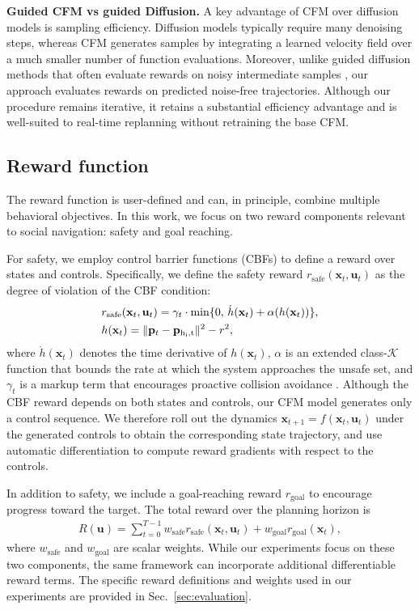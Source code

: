 \documentclass[letterpaper,10 pt,conference]{ieeeconf}
\begin{document}
\noindent\textbf{Guided CFM vs guided Diffusion.} 
A key advantage of CFM over diffusion models is sampling efficiency. 
Diffusion models typically require many denoising steps, whereas CFM generates samples by integrating a learned velocity field over a much smaller number of function evaluations. 
Moreover, unlike guided diffusion methods that often evaluate rewards on noisy intermediate samples \cite{MizutaLeung2024}, our approach evaluates rewards on predicted noise-free trajectories. 
Although our procedure remains iterative, it retains a substantial efficiency advantage and is well-suited to real-time replanning without retraining the base CFM.

\subsection{Reward function} 
The reward function is user-defined and can, in principle, combine multiple behavioral objectives. 
In this work, we focus on two reward components relevant to social navigation: safety and goal reaching. 

For safety, we employ control barrier functions (CBFs) \cite{AmesCooganEtAl2019} to define a reward over states and controls. 
Specifically, we define the safety reward $r_\mathrm{safe}(\mathbf{x}_t,\mathbf{u}_t)$ as the degree of violation of the CBF condition:
\begin{align}
    &r_\mathrm{safe}(\mathbf{x}_t, \mathbf{u}_t) = \gamma_t\cdot\min\{0,\,\dot{h}(\mathbf{x}_t) + \alpha(h(\mathbf{x}_t))\},\\
    &h(\mathbf{x}_t) = \|\mathbf{p}_t - \mathbf{p}_\mathrm{h_i,t}\|^2 - r^2,\notag
\end{align}
where $\dot{h}(\mathbf{x}_t)$ denotes the time derivative of $h(\mathbf{x}_t)$, $\alpha$ is an extended class-$\mathcal{K}$ function that bounds the rate at which the system approaches the unsafe set, and $\gamma_t$ is a markup term that encourages proactive collision avoidance \cite{GeldenbottLeung2024}.
Although the CBF reward depends on both states and controls, our CFM model generates only a control sequence. 
We therefore roll out the dynamics $\mathbf{x}_{t+1}=f(\mathbf{x}_t,\mathbf{u}_t)$ under the generated controls to obtain the corresponding state trajectory, and use automatic differentiation to compute reward gradients with respect to the controls.

In addition to safety, we include a goal-reaching reward $r_\mathrm{goal}$ to encourage progress toward the target. 
The total reward over the planning horizon is
\begin{align}
R(\mathbf{u}) = \sum_{t=0}^{T-1}  w_\mathrm{safe} r_\mathrm{safe}(\mathbf{x}_t, \mathbf{u}_t) + w_\mathrm{goal}  r_\mathrm{goal}(\mathbf{x}_t), 
\end{align}
where $w_\mathrm{safe}$ and $w_\mathrm{goal}$ are scalar weights. 
While our experiments focus on these two components, the same framework can incorporate additional differentiable reward terms. 
The specific reward definitions and weights used in our experiments are provided in Sec.~\ref{sec:evaluation}.
\end{document}
